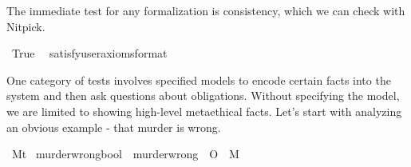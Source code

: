 \begin{isabellebody}
\begin{isamarkuptext}
The immediate test for any formalization is consistency, which we can check with Nitpick.%
\end{isamarkuptext}\isamarkuptrue%
\isamarkupfalse%
\ True\ \isamarkupfalse%
\ {\isacharbrackleft}satisfy{\isacharcomma}user{\isacharunderscore}axioms{\isacharcomma}format{\isacharequal}{}{\isacharbrackright}%
\isadelimproof
\ %
\endisadelimproof
%
\isatagproof
{}\isamarkupfalse%
\isanewline
%
\isanewline
%
\isanewline
%
\endisatagproof
{\isafoldproof}%
%
\isadelimproof
%
\endisadelimproof
%
\isadelimproof
%
\endisadelimproof
%
\isatagproof
%
\endisatagproof
{\isafoldproof}%
%
\isadelimproof
%
\endisadelimproof
%
\isadelimproof
%
\endisadelimproof
%
\isatagproof
%
\endisatagproof
{\isafoldproof}%
%
\isadelimproof
%
\endisadelimproof
%
\isadelimproof
%
\endisadelimproof
%
\isatagproof
%
\endisatagproof
{\isafoldproof}%
%
\isadelimproof
%
\endisadelimproof
%
\isadelimproof
%
\endisadelimproof
%
\isatagproof
%
\endisatagproof
{\isafoldproof}%
%
\isadelimproof
%
\endisadelimproof
%
\isadelimdocument
%
\endisadelimdocument
%
\isatagdocument
%
\isamarkuptrue%
%
\endisatagdocument
{\isafolddocument}%
%
\isadelimdocument
%
\endisadelimdocument
%
\begin{isamarkuptext}%
One category of tests involves specified models to encode certain facts 
into the system and then ask questions about obligations. Without specifying the model, we are limited 
to showing high-level metaethical facts. Let's start with analyzing an obvious example - that murder is 
wrong.%
\end{isamarkuptext}\isamarkuptrue%
\isamarkupfalse%
\ M{\isacharcolon}{\isacharcolon}{\isachardoublequoteopen}t{\isachardoublequoteclose}\isanewline
{}\isamarkupfalse%
\ murder{\isacharunderscore}wrong{\isacharcolon}{\isacharcolon}{\isachardoublequoteopen}bool{\isachardoublequoteclose}\ \ {\isachardoublequoteopen}murder{\isacharunderscore}wrong\ {\isasymequiv}\ {\isasymTurnstile}{\isacharparenleft}O\ {\isacharbraceleft}\isactrlbold {\isasymnot}\ M{\isacharbraceright}{\isacharparenright}{\isachardoublequoteclose}\isanewline

\end{isabellebody}
